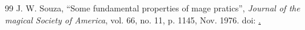 \documentclass[a4paper,12pt,oneside,openany]{book}
\begin{document}
	
	\frontmatter
	\gerarCapa
	\gerarFolhaAprovacao
	\gerarFolhaFrase        
	\gerarFolhaAgradecimentos 
	\newpage
	\tableofcontents
	\listoffigures
	
	\mainmatter
	
	
	  
	
	
	\backmatter
	
	\begin{thebibliography}{99}
		 J. W. Souza, ``Some fundamental properties of mage pratics'', \textit{Journal of the magical Society of America}, vol. 66, no. 11, p. 1145, Nov. 1976. doi: \href{https://doi.org/10.}.
							
	\end{thebibliography}
	
	\printglossary
	\printindex
	
\end{document}
